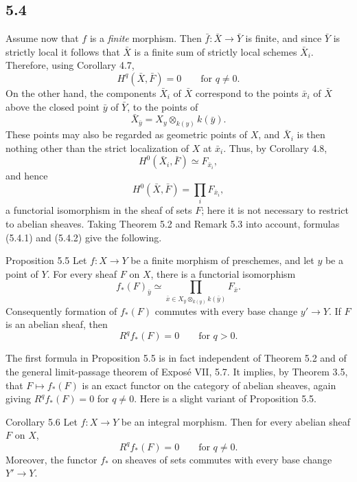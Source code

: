 \subsection*{5.4}
Assume now that \(f\) is a \emph{finite} morphism. Then \(\bar f:\bar X\to\bar Y\) is finite, and since \(\bar Y\) is strictly local it follows that \(\bar X\) is a finite sum of strictly local schemes \(\bar X_i\). Therefore, using Corollary 4.7,
\[
H^q(\bar X,\bar F)=0\qquad\text{for }q\ne 0.
\tag{5.4.1}
\]
On the other hand, the components \(\bar X_i\) of \(\bar X\) correspond to the points \(\bar x_i\) of \(\bar X\) above the closed point \(\bar y\) of \(\bar Y\), \ie to the points of
\[
\bar X_{\bar y}=X_y\otimes_{k(y)}k(\bar y).
\]
These points may also be regarded as geometric points of \(X\), and \(\bar X_i\) is then nothing other than the strict localization of \(X\) at \(\bar x_i\). Thus, by Corollary 4.8,
\[
H^0(\bar X_i,\bar F)\simeq F_{\bar x_i},
\]
and hence
\[
H^0(\bar X,\bar F)=\prod_i F_{\bar x_i},
\tag{5.4.2}
\]
a functorial isomorphism in the sheaf of sets \(F\); here it is not necessary to restrict to abelian sheaves. Taking Theorem 5.2 and Remark 5.3 into account, formulas (5.4.1) and (5.4.2) give the following.

\begin{statement}{Proposition 5.5}
Let \(f:X\to Y\) be a finite morphism of preschemes, and let \(y\) be a point of \(Y\). For every sheaf \(F\) on \(X\), there is a functorial isomorphism
\[
f_*(F)_{\bar y}\simeq \prod_{\bar x\in X_y\otimes_{k(y)}k(\bar y)}F_{\bar x}.
\]
Consequently formation of \(f_*(F)\) commutes with every base change \(y'\to Y\). If \(F\) is an abelian sheaf, then
\[
R^qf_*(F)=0\qquad\text{for }q>0.
\]
\end{statement}

The first formula in Proposition 5.5 is in fact independent of Theorem 5.2 and of the general limit-passage theorem of Expos\'e VII, 5.7. It implies, by Theorem 3.5, that \(F\mapsto f_*(F)\) is an exact functor on the category of abelian sheaves, again giving \(R^qf_*(F)=0\) for \(q\ne 0\). Here is a slight variant of Proposition 5.5.

\begin{statement}{Corollary 5.6}
Let \(f:X\to Y\) be an integral morphism. Then for every abelian sheaf \(F\) on \(X\),
\[
R^qf_*(F)=0\qquad\text{for }q\ne 0.
\]
Moreover, the functor \(f_*\) on sheaves of sets commutes with every base change \(Y'\to Y\).
\end{statement}

